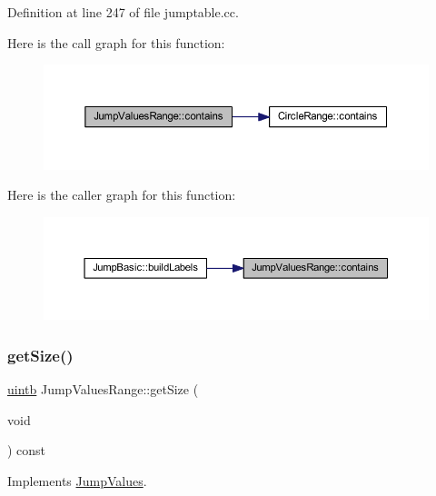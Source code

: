Definition at line 247 of file jumptable.\+cc.

Here is the call graph for this function\+:
\nopagebreak
\begin{figure}[H]
\begin{center}
\leavevmode
\includegraphics[width=350pt]{class_jump_values_range_ac498609bd6eb43a1b7d1d5bc3ad2152b_cgraph}
\end{center}
\end{figure}
Here is the caller graph for this function\+:
\nopagebreak
\begin{figure}[H]
\begin{center}
\leavevmode
\includegraphics[width=350pt]{class_jump_values_range_ac498609bd6eb43a1b7d1d5bc3ad2152b_icgraph}
\end{center}
\end{figure}
\mbox{\label{class_jump_values_range_aabad0182df2b5178abcb597278a4ec20}} 
\subsubsection{\texorpdfstring{getSize()}{getSize()}}
{\footnotesize\ttfamily \mbox{\hyperlink{types_8h_a2db313c5d32a12b01d26ac9b3bca178f}{uintb}} Jump\+Values\+Range\+::get\+Size (\begin{DoxyParamCaption}\item[{void}]{ }\end{DoxyParamCaption}) const\hspace{0.3cm}{\ttfamily [virtual]}}



Implements \mbox{\hyperlink{class_jump_values_abe5edd38ba4e0e00f68e1d5932f338bc}{Jump\+Values}}.



